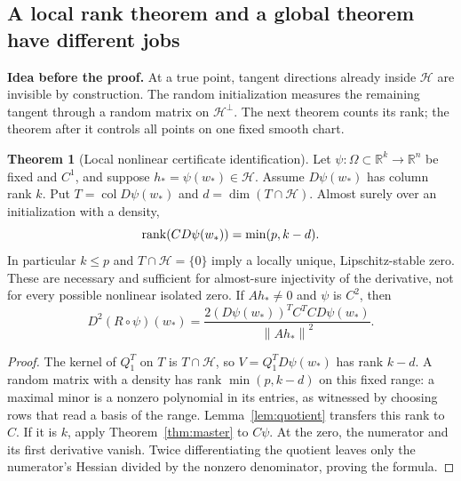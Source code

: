 \documentclass[11pt,a4paper]{article}
\theoremstyle{definition}
\newtheorem{theorem}{Theorem}[section]
\theoremstyle{definition}
\theoremstyle{remark}\newtheorem{remark}[theorem]{Remark}
\newcommand{\R}{\mathbb R}\newcommand{\Prob}{\mathbb P}\newcommand{\E}{\mathbb E}
\newcommand{\HH}{\mathcal H}\newcommand{\XX}{\mathcal X}\newcommand{\col}{\operatorname{col}}
\newcommand{\norm}[1]{\left\lVert #1\right\rVert}
\newcommand{\proofidea}[1]{\par\textcolor{chartblue}{\textbf{Idea before the proof.}} #1\par}
\begin{document}
\subsection{A local rank theorem and a global theorem have different jobs}

\proofidea{At a true point, tangent directions already inside $\HH$ are invisible by construction. The random initialization measures the remaining tangent through a random matrix on $\HH^\perp$. The next theorem counts its rank; the theorem after it controls all points on one fixed smooth chart.}

\begin{theorem}[Local nonlinear certificate identification]\label{thm:localcert}
Let $\psi:\Omega\subset\R^k\to\R^n$ be fixed and $C^1$, and suppose $h_*=\psi(w_*)\in\HH$. Assume $D\psi(w_*)$ has column rank $k$. Put $T=\col D\psi(w_*)$ and $d=\dim(T\cap\HH)$. Almost surely over an initialization with a density,
\[
\operatorname{rank}(CD\psi(w_*))=\min(p,k-d).
\]
In particular $k\le p$ and $T\cap\HH=\{0\}$ imply a locally unique, Lipschitz-stable zero. These are necessary and sufficient for almost-sure injectivity of the derivative, not for every possible nonlinear isolated zero. If $Ah_*\ne0$ and $\psi$ is $C^2$, then
\[
D^2(R\circ\psi)(w_*)=
\frac{2(D\psi(w_*))^TC^TCD\psi(w_*)}{\norm{Ah_*}^2}.
\]
\end{theorem}
\begin{proof}
The kernel of $Q_1^T$ on $T$ is $T\cap\HH$, so $V=Q_1^TD\psi(w_*)$ has rank $k-d$. A random matrix with a density has rank $\min(p,k-d)$ on this fixed range: a maximal minor is a nonzero polynomial in its entries, as witnessed by choosing rows that read a basis of the range. Lemma~\ref{lem:quotient} transfers this rank to $C$. If it is $k$, apply Theorem~\ref{thm:master} to $C\psi$. At the zero, the numerator and its first derivative vanish. Twice differentiating the quotient leaves only the numerator's Hessian divided by the nonzero denominator, proving the formula.
\end{proof}
\end{document}
